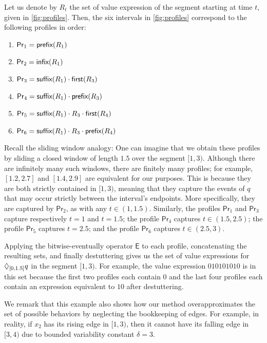 \begin{example}
	
	Let us denote by $R_t$ the set of value expression of the segment starting at time $t$, given in \cref{fig:profiles}.
	Then, the six intervals in \cref{fig:profiles} correspond to the following profiles in order:
	\begin{enumerate}
		\item $\mathsf{Pr}_1 = \textsf{prefix}(R_1)$
		\item $\mathsf{Pr}_2 = \textsf{infix}(R_1)$
		\item $\mathsf{Pr}_3 = \textsf{suffix}(R_1) \cdot \textsf{first}(R_3)$
		\item $\mathsf{Pr}_4 = \textsf{suffix}(R_1) \cdot \textsf{prefix}(R_3)$
		\item $\mathsf{Pr}_5 = \textsf{suffix}(R_1) \cdot R_3 \cdot \textsf{first}(R_4)$
		\item $\mathsf{Pr}_6 = \textsf{suffix}(R_1) \cdot R_3 \cdot \textsf{prefix}(R_4)$
	\end{enumerate}
	Recall the sliding window analogy:
	One can imagine that we obtain these profiles by sliding a closed window of length $1.5$ over the segment $[1,3)$.
	Although there are infinitely many such windows, there are finitely many profiles; for example, $[1.2,2.7]$ and $[1.4,2.9]$ are equivalent for our purposes.
	This is because they are both strictly contained in $[1,3)$, meaning that they capture the events of $q$ that may occur strictly between the interval's endpoints.
	More specifically, they are captured by $\mathsf{Pr}_2$, as with any $t \in (1,1.5)$.
	Similarly, the profiles $\mathsf{Pr}_1$ and $\mathsf{Pr}_3$ capture respectively $t = 1$ and $t = 1.5$; the profile $\mathsf{Pr}_4$ captures $t \in (1.5,2.5)$; the profile $\mathsf{Pr}_5$ captures $t = 2.5$; and the profile $\mathsf{Pr}_6$ captures $t \in (2.5,3)$.   
	
	Applying the bitwise-eventually operator $\mathsf{E}$ to each profile, concatenating the resulting sets, and finally destuttering gives us the set of value expressions for $\lozenge_{[0,1.5]} q$ in the segment $[1,3)$.
	For example, the value expression $0 10 10 10 10$ is in this set because the first two profiles each contain $0$ and the last four profiles each contain an expression equivalent to $10$ after destuttering.
	
	We remark that this example also shows how our method overapproximates the set of possible behaviors by neglecting the bookkeeping of edges.
	For example, in reality, if $x_2$ has its rising edge in $[1,3)$, then it cannot have its falling edge in $[3,4)$ due to bounded variability constant $\delta = 3$.
\end{example}

